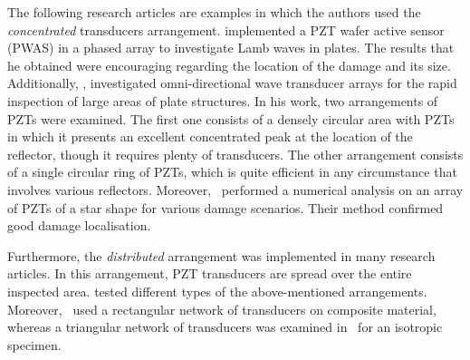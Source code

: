 The following research articles are examples in which the authors used the \emph{concentrated} transducers arrangement.
\textcite{Giurgiutiu2006} implemented a PZT wafer active sensor (PWAS) in a phased array to investigate Lamb waves in plates.
The results that he obtained were encouraging regarding the location of the damage and its size.
Additiona\-lly, \textcite{Wilcox2003}, investigated omni-directional wave transducer arrays for the rapid inspection of large areas of plate structures.
In his work, two arrangements of PZTs were examined.
The first one consists of a densely circular area with PZTs in which it presents an excellent concentrated peak at the location of the reflector, though it requires plenty of transducers.
The other arrangement consists of a single circular ring of PZTs, which is quite efficient in any circumstance that involves various reflectors.
Moreover,~\textcite{Malinowski2009} performed a numerical analysis on an array of PZTs of a star shape for various damage scenarios. 
Their method confirmed good damage localisation.

Furthermore, the \emph{distributed} arrangement was implemented in many research articles.
In this arrangement, PZT transducers are spread over the entire inspected area.
\textcite{Schubert2008} tested different types of the above-mentioned arrangements.
Moreover,~\textcite{Qiang2009} used a rectangular network of transducers on composite material, whereas a triangular network of transducers was examined in~\cite{Wandowski2009} for an isotropic specimen.

